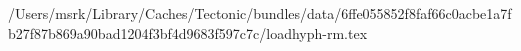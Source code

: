 /Users/msrk/Library/Caches/Tectonic/bundles/data/6ffe055852f8faf66c0acbe1a7fb27f87b869a90bad1204f3bf4d9683f597c7c/loadhyph-rm.tex